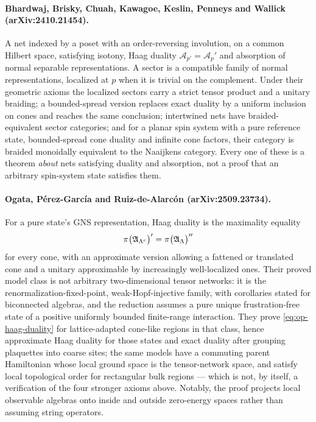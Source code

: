 \paragraph{Bhardwaj, Brisky, Chuah, Kawagoe, Keslin, Penneys and Wallick
(arXiv:2410.21454).} A net indexed by a poset with an order-reversing
involution, on a common Hilbert space, satisfying isotony, Haag duality
$\mathcal{A}_{p'}=\mathcal{A}_p'$ and absorption of normal separable
representations. A sector is a compatible family of normal representations,
localized at $p$ when it is trivial on the complement. Under their geometric
axioms the localized sectors carry a strict tensor product and a unitary
braiding; a bounded-spread version replaces exact duality by a uniform
inclusion on cones and reaches the same conclusion; intertwined nets have
braided-equivalent sector categories; and for a planar spin system with a pure
reference state, bounded-spread cone duality and infinite cone factors, their
category is braided monoidally equivalent to the Naaijkens category. Every one
of these is a theorem \emph{about} nets satisfying duality and absorption, not
a proof that an arbitrary spin-system state satisfies them.

\paragraph{Ogata, P\'erez-Garc\'ia and Ruiz-de-Alarc\'on (arXiv:2509.23734).}
For a pure state's GNS representation, Haag duality is the maximality equality
\begin{equation}
  \pi\bigl(\mathfrak{A}_{\Lambda^c}\bigr)'=\pi\bigl(\mathfrak{A}_{\Lambda}\bigr)''
  \label{eq:op-haag-duality}
\end{equation}
for every cone, with an approximate version allowing a fattened or translated
cone and a unitary approximable by increasingly well-localized ones. Their
proved model class is not arbitrary two-dimensional tensor networks: it is the
renormalization-fixed-point, weak-Hopf-injective family, with corollaries
stated for biconnected algebras, and the reduction assumes a pure unique
frustration-free state of a positive uniformly bounded finite-range
interaction. They prove \eqref{eq:op-haag-duality} for lattice-adapted
cone-like regions in that class, hence approximate Haag duality for those
states and exact duality after grouping plaquettes into coarse sites; the same
models have a commuting parent Hamiltonian whose local ground space is the
tensor-network space, and satisfy local topological order for rectangular bulk
regions --- which is not, by itself, a verification of the four stronger axioms
above. Notably, the proof projects local observable algebras onto inside and
outside zero-energy spaces rather than assuming string operators.

